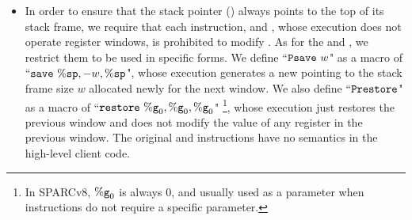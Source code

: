 \begin{itemize}
    \item
    In order to ensure that
    the stack pointer (\spreg{}) always
    points to the top of its stack frame, we require that
    each instruction, \eg{} \cadd{} and \ld{}, whose
    execution does not operate register windows,
    is prohibited to modify \spreg{}. 
    As for the \csave{} and \crestore{},
    we restrict them
    to be used in specific forms.
    We define ``$\texttt{Psave} \ w$" as a macro of
    ``$\texttt{save}{} \ \%\texttt{sp}, -w, \%\texttt{sp}$", whose execution
    generates a new \spreg{} pointing to the stack frame
    size $w$ allocated newly for the next window.
    We also define ``$\texttt{Prestore}$"
    as a macro of ``$\texttt{restore}{} \ \%\texttt{g}_{0}, \%\texttt{g}_{0}, \%\texttt{g}_{0}$"
    \footnote{In SPARCv8, $\%\texttt{g}_{0}$ is always 0,
    and usually used as a parameter when instructions do not
    require a specific parameter.},
    whose execution just restores the previous window
    and does not modify the value of any register
    in the previous window.
    The original \csave{} and \crestore{} instructions
    have no semantics in the high-level client code.


\end{itemize}
